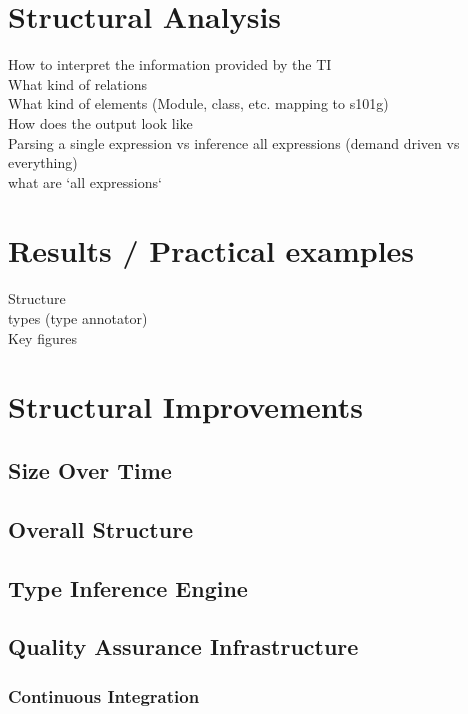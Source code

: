 \documentclass[12pt,halfparskip]{scrreprt}
\begin{document}
\chapter{Structural Analysis}
How to interpret the information provided by the TI \\
What kind of relations \\
What kind of elements (Module, class, etc. mapping to s101g) \\
How does the output look like \\
Parsing a single expression vs inference all expressions (demand driven vs everything)\\
 what are `all expressions`\\

\chapter{Results / Practical examples}
Structure \\
types (type annotator)\\
Key figures\\



\chapter{Structural Improvements}
\section{Size Over Time}
\section{Overall Structure}
\section{Type Inference Engine}
\section{Quality Assurance Infrastructure}
\subsection{Continuous Integration}
\end{document}
